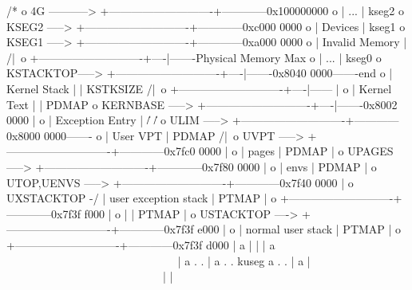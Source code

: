\begin{CodeBlock}[language=BookC]
/*
 o     4G ----------->  +----------------------------+------------0x100000000
 o                      |       ...                  |  kseg2
 o      KSEG2    -----> +----------------------------+------------0xc000 0000
 o                      |          Devices           |  kseg1
 o      KSEG1    -----> +----------------------------+------------0xa000 0000
 o                      |      Invalid Memory        |   /|\
 o                      +----------------------------+----|-------Physical Memory Max
 o                      |       ...                  |  kseg0
 o      KSTACKTOP-----> +----------------------------+----|-------0x8040 0000-------end
 o                      |       Kernel Stack         |    | KSTKSIZE            /|\
 o                      +----------------------------+----|------                |
 o                      |       Kernel Text          |    |                    PDMAP
 o      KERNBASE -----> +----------------------------+----|-------0x8002 0000    |
 o                      |      Exception Entry       |   \|/                    \|/
 o      ULIM     -----> +----------------------------+------------0x8000 0000-------
 o                      |         User VPT           |     PDMAP                /|\
 o      UVPT     -----> +----------------------------+------------0x7fc0 0000    |
 o                      |           pages            |     PDMAP                 |
 o      UPAGES   -----> +----------------------------+------------0x7f80 0000    |
 o                      |           envs             |     PDMAP                 |
 o  UTOP,UENVS   -----> +----------------------------+------------0x7f40 0000    |
 o  UXSTACKTOP -/       |     user exception stack   |     PTMAP                 |
 o                      +----------------------------+------------0x7f3f f000    |
 o                      |                            |     PTMAP                 |
 o      USTACKTOP ----> +----------------------------+------------0x7f3f e000    |
 o                      |     normal user stack      |     PTMAP                 |
 o                      +----------------------------+------------0x7f3f d000    |
 a                      |                            |                           |
 a                      ~~~~~~~~~~~~~~~~~~~~~~~~~~~~~~                           |
 a                      .                            .                           |
 a                      .                            .                         kuseg
 a                      .                            .                           |
 a                      |~~~~~~~~~~~~~~~~~~~~~~~~~~~~|                           |

\end{CodeBlock}
